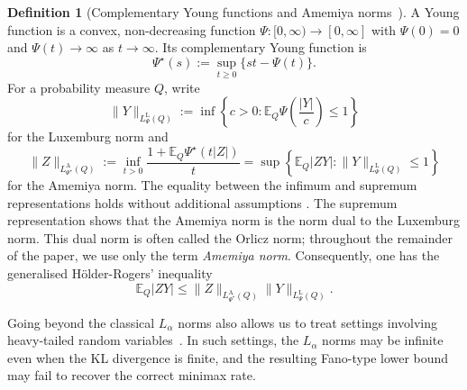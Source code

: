 \documentclass[11pt]{article}
\theoremstyle{definition}
\newtheorem{definition}[theorem]{Definition}
\theoremstyle{remark}
\newcommand{\1}{\boldsymbol{1}}
\begin{document}
\begin{definition}[Complementary Young functions and Amemiya norms~\cite{RaoRen1991,HudzikMaligranda2000}]
A Young function is a convex, non-decreasing function
$\Psi:[0,\infty)\to[0,\infty]$ with $\Psi(0)=0$ and
$\Psi(t)\to\infty$ as $t\to\infty$. Its complementary Young function is
\begin{equation}
\Psi^\star(s):=\sup_{t\geq0}\{st-\Psi(t)\}.
\end{equation}
For a probability measure $Q$, write
\begin{equation}
\|Y\|_{L_\Psi^\mathrm L(Q)}
:=
\inf\left\{c>0:\mathbb E_Q\Psi\left(\frac{|Y|}{c}\right)\leq1\right\}
\end{equation}
for the Luxemburg norm and
\begin{equation}
\|Z\|_{L_{\Psi^\star}^\mathrm A(Q)}
:=
\inf_{t>0}
\frac{1+\mathbb E_Q\Psi^\star(t|Z|)}{t}
=
\sup\left\{\mathbb E_Q|ZY|:\|Y\|_{L_\Psi^\mathrm L(Q)}\leq1\right\}
\end{equation}
for the Amemiya norm.  The equality between the infimum and supremum
representations holds without additional assumptions
\cite{HudzikMaligranda2000}.
The supremum representation shows that the Amemiya norm is the norm dual
to the Luxemburg norm. This dual norm is often called the Orlicz norm;
throughout the remainder of the paper, we use only the term
\emph{Amemiya norm}.
Consequently, one has the generalised H\"older-Rogers' inequality~\cite{RaoRen1991,HudzikMaligranda2000}
\[
\mathbb E_Q|ZY|
\leq
\|Z\|_{L_{\Psi^\star}^\mathrm A(Q)}
\|Y\|_{L_\Psi^\mathrm L(Q)}.
\]
\end{definition}
Going beyond the classical \(L_\alpha\) norms also allows us to treat settings involving heavy-tailed random variables~\cite{EspositoMondelli}. In such settings, the \(L_\alpha\) norms may be infinite even when the KL divergence is finite, and the resulting Fano-type lower bound may fail to recover the correct minimax rate.
\end{document}
